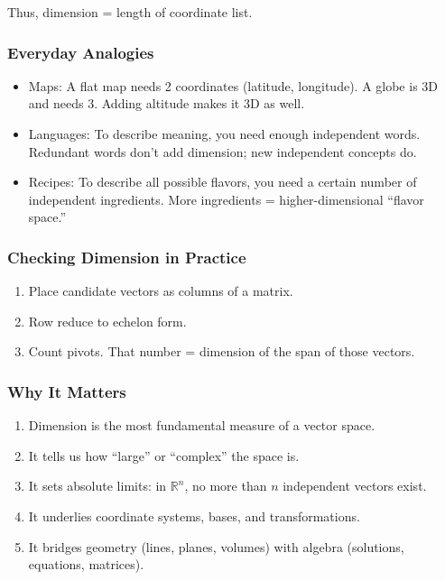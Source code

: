 \documentclass[
  letterpaper,
  DIV=11,
  numbers=noendperiod]{scrreprt}
\providecommand{\tightlist}{%
  \setlength{\itemsep}{0pt}\setlength{\parskip}{0pt}}
\begin{document}
Thus, dimension = length of coordinate list.

\subsubsection{Everyday Analogies}\label{everyday-analogies-32}

\begin{itemize}
\tightlist
\item
  Maps: A flat map needs 2 coordinates (latitude, longitude). A globe is
  3D and needs 3. Adding altitude makes it 3D as well.
\item
  Languages: To describe meaning, you need enough independent words.
  Redundant words don't add dimension; new independent concepts do.
\item
  Recipes: To describe all possible flavors, you need a certain number
  of independent ingredients. More ingredients = higher-dimensional
  ``flavor space.''
\end{itemize}

\subsubsection{Checking Dimension in
Practice}\label{checking-dimension-in-practice}

\begin{enumerate}
\def\labelenumi{\arabic{enumi}.}
\tightlist
\item
  Place candidate vectors as columns of a matrix.
\item
  Row reduce to echelon form.
\item
  Count pivots. That number = dimension of the span of those vectors.
\end{enumerate}

\subsubsection{Why It Matters}\label{why-it-matters-32}

\begin{enumerate}
\def\labelenumi{\arabic{enumi}.}
\tightlist
\item
  Dimension is the most fundamental measure of a vector space.
\item
  It tells us how ``large'' or ``complex'' the space is.
\item
  It sets absolute limits: in \(\mathbb{R}^n\), no more than \(n\)
  independent vectors exist.
\item
  It underlies coordinate systems, bases, and transformations.
\item
  It bridges geometry (lines, planes, volumes) with algebra (solutions,
  equations, matrices).
\end{enumerate}
\end{document}
